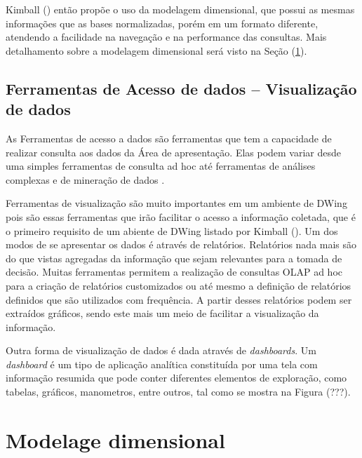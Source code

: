%

Kimball (\citeyear{kimball2002}) então propõe o uso da modelagem dimensional, que possui as mesmas informações que as bases normalizadas, porém em um formato diferente, atendendo a facilidade na navegação e na performance das consultas. Mais detalhamento sobre a modelagem dimensional será visto na Seção (\ref{sec-dimensional-modeling}).

%

\subsection{Ferramentas de Acesso de dados – Visualização de dados}

%

As Ferramentas de acesso a dados são ferramentas que tem a capacidade de realizar consulta aos dados da Área de apresentação. Elas podem variar desde uma simples ferramentas de consulta ad hoc até ferramentas de análises complexas e de mineração de dados \cite{kimball2002}.

%

Ferramentas de visualização são muito importantes em um ambiente de DWing pois são essas ferramentas que irão facilitar o acesso a informação coletada, que é o primeiro requisito de um abiente de DWing listado por Kimball (\citeyear{kimball2002}). Um dos modos de se apresentar os dados é através de relatórios. Relatórios nada mais são do que vistas agregadas da informação que sejam relevantes para a tomada de decisão. Muitas ferramentas permitem a realização de consultas OLAP ad hoc para a criação de relatórios customizados ou até mesmo a definição de relatórios definidos que são utilizados com frequência. A partir desses relatórios podem ser extraídos gráficos, sendo este mais um meio de facilitar a visualização da informação. 

%

Outra forma de visualização de dados é dada através  de \emph{dashboards}. Um \emph{dashboard} é um tipo de aplicação analítica constituída por uma tela com informação resumida que pode conter diferentes elementos de exploração, como tabelas, gráficos, manometros, entre outros, tal como se mostra na Figura (???).



%

\section{Modelage dimensional}
\label{sec-dimensional-modeling}

